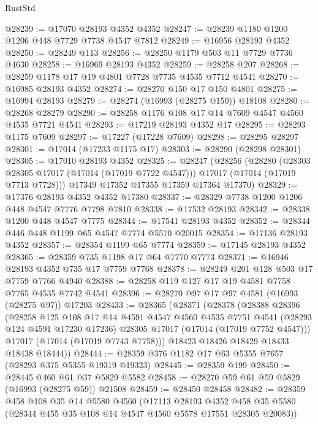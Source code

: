 \begin{lexlean}{RustStd}
\begin{coremodule}
@28239 := @17070 @28193 @4352 @4352
@28247 := @28239 @1180 @1200 @1206 @448 @7729 @7738 @4547 @7812
@28249 := @16956 @28193 @4352
@28250 := @28249 @113
@28256 := @28250 @1179 @503 @11 @7729 @7736 @4630
@28258 := @16969 @28193 @4352
@28259 := @28258 @207
@28268 := @28259 @1178 @17 @19 @4801 @7728 @7735 @4535 @7712 @4541
@28270 := @16985 @28193 @4352
@28274 := @28270 @150 @17 @150 @4801
@28275 := @16994 @28193
@28279 := @28274 (@16993 (@28275 @150)) @18108
@28280 := @28268 @28279
@28290 := @28258 @1176 @108 @17 @14 @7609 @4547 @4560 @4535 @7721 @4541
@28293 := @17219 @28193 @4352 @17
@28295 := @28293 @1175 @7609
@28297 := @17227 (@17228 @7609)
@28298 := @28295 @28297
@28301 := @17014 (@17233 @1175 @17)
@28303 := @28290 (@28298 @28301)
@28305 := @17010 @28193 @4352
@28325 := @28247
    (@28256
      (@28280
        (@28303 @28305 @17017 (@17014 (@17019 @7722 @4547)))
        @17017
        (@17014 (@17019 @7713 @7728)))
      @17349
      @17352
      @17355
      @17359
      @17364
      @17370)
@28329 := @17376 @28193 @4352 @4352 @17380
@28337 := @28329 @7738 @1200 @1206 @448 @4547 @7776 @7798 @7810
@28338 := @17532 @28193
@28342 := @28338 @1200 @448 @4547 @7775
@28344 := @17541 @28193 @4352
@28352 := @28344 @446 @448 @1199 @65 @4547 @7774 @5570 @20015
@28354 := @17136 @28193 @4352
@28357 := @28354 @1199 @65 @7774
@28359 := @17145 @28193 @4352
@28365 := @28359 @735 @1198 @17 @64 @7770 @7773
@28371 := @16946 @28193 @4352 @735 @17 @7759 @7768
@28378 := @28249 @201 @128 @503 @17 @7759 @7766 @4940
@28388 := @28258 @119 @127 @17 @19 @4581 @7758 @7765 @4535 @7742 @4541
@28396 := @28270 @97 @17 @97 @4581 (@16993 (@28275 @97)) @17203
@28433 := @28365
    (@28371
      (@28378
        (@28388
          @28396
          (@28258
            @125
            @108
            @17
            @14
            @4591
            @4547
            @4560
            @4535
            @7751
            @4541
            (@28293 @124 @4591 @17230 @17236)
            @28305
            @17017
            (@17014 (@17019 @7752 @4547)))
          @17017
          (@17014 (@17019 @7743 @7758)))
        @18423
        @18426
        @18429
        @18433
        @18438
        @18444))
@28444 := @28359 @376 @1182 @17 @63 @5355 @7657 (@28293 @375 @5355 @19319 @19323)
@28445 := @28359 @199
@28450 := @28445 @460 @61 @37 @5829 @5582
@28458 := @28270 @59 @61 @59 @5829 (@16993 (@28275 @59)) @21508
@28459 := @28450 @28458
@28482 := @28359
    @458
    @108
    @35
    @14
    @5580
    @4560
    (@17113
      @28193
      @4352
      @458
      @35
      @5580
      (@28344 @455 @35 @108 @14 @4547 @4560 @5578 @17551 @28305 @20083))

\end{coremodule}
\end{lexlean}
